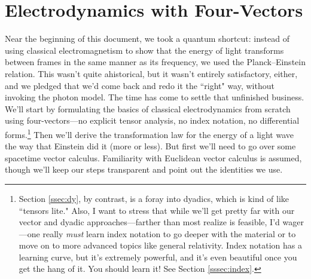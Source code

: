 \documentclass[12pt]{article}
\renewcommand{\vv}[1]{\mathbf{#1}}
\begin{document}



\clearpage

\section{Electrodynamics with Four-Vectors}\label{sec:rem}

Near the beginning of this document, we took a quantum shortcut: instead of using classical electromagnetism to show that the energy of light transforms between frames in the same manner as its frequency, we used the Planck--Einstein relation. This wasn't quite ahistorical, but it wasn't entirely satisfactory, either, and we pledged that we'd come back and redo it the ``right" way, without invoking the photon model. The time has come to settle that unfinished business. We'll start by formulating the basics of classical electrodynamics from scratch using four-vectors---no explicit tensor analysis, no index notation, no differential forms.\footnote{Section \ref{ssec:dy}, by contrast, is a foray into dyadics, which is kind of like ``tensors lite." Also, I want to stress that while we'll get pretty far with our vector and dyadic approaches---farther than most realize is feasible, I'd wager---one really \emph{must} learn index notation to go deeper with the material or to move on to more advanced topics like general relativity. Index notation has a learning curve, but it's extremely powerful, and it's even beautiful once you get the hang of it. You should learn it! See Section \ref{sssec:index}.} Then we'll derive the transformation law for the energy of a light wave the way that Einstein did it (more or less). But first we'll need to go over some spacetime vector calculus. Familiarity with Euclidean vector calculus is assumed, though we'll keep our steps transparent and point out the identities we use.
\end{document}

